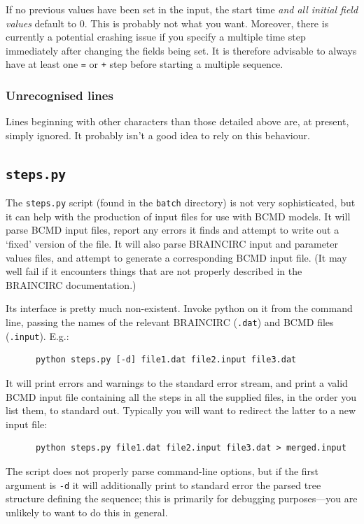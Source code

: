 \documentclass[a4paper,11pt]{article}
\begin{document}
If no previous values have been set in the input, the start time \textit{and all initial field values} default to 0. This is probably not what you want. Moreover, there is currently a potential crashing issue if you specify a multiple time step immediately after changing the fields being set. It is therefore advisable to always have at least one \texttt{=} or \texttt{+} step before starting a multiple sequence.

\subsubsection{Unrecognised lines}
Lines beginning with other characters than those detailed above are, at present, simply ignored. It probably isn't a good idea to rely on this behaviour.

\subsection{\texttt{steps.py}}\label{steps:py}

The \texttt{steps.py} script (found in the \texttt{batch} directory) is not very sophisticated, but it can help with the production of input files for use with BCMD models. It will parse BCMD input files, report any errors it finds and attempt to write out a `fixed' version of the file. It will also parse BRAINCIRC input and parameter values files, and attempt to generate a corresponding BCMD input file. (It may well fail if it encounters things that are not properly described in the BRAINCIRC documentation.)

Its interface is pretty much non-existent. Invoke python on it from the command line, passing the names of the relevant BRAINCIRC (\texttt{.dat}) and BCMD files (\texttt{.input}). E.g.:
\begin{verbatim}
      python steps.py [-d] file1.dat file2.input file3.dat
\end{verbatim}
It will print errors and warnings to the standard error stream, and print a valid BCMD input file containing all the steps in all the supplied files, in the order you list them, to standard out. Typically you will want to redirect the latter to a new input file:
\begin{verbatim}
      python steps.py file1.dat file2.input file3.dat > merged.input
\end{verbatim}
The script does not properly parse command-line options, but if the first argument is \texttt{-d} it will additionally print to standard error the parsed tree structure defining the sequence; this is primarily for debugging purposes---you are unlikely to want to do this in general.
\end{document}
